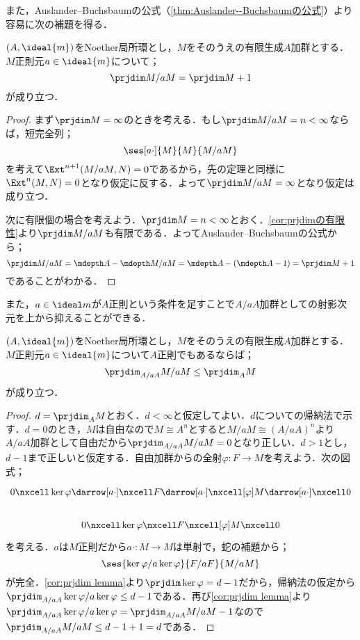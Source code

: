 また，Auslander--Buchsbaumの公式（\ref{thm:Auslander--Buchsbaumの公式}）より容易に次の補題を得る．

\begin{lem}\label{lem:prjdim M/aM}
	$(A,\ideal{m})$をNoether局所環とし，$M$をそのうえの有限生成$A$加群とする．$M$正則元$a\in\ideal{m}$について；
	\[\prjdim M/aM=\prjdim M+1\]
	が成り立つ．
\end{lem}

\begin{proof}
	まず$\prjdim M=\infty$のときを考える．もし$\prjdim M/aM=n<\infty$ならば，短完全列；
	\[\ses[a\cdot]{M}{M}{M/aM}\]
	を考えて$\Ext^{n+1}(M/aM,N)=0$であるから，先の定理と同様に$\Ext^n(M,N)=0$となり仮定に反する．よって$\prjdim M/aM=\infty$となり仮定は成り立つ．
	
	次に有限個の場合を考えよう．$\prjdim M=n<\infty$とおく．\ref{cor:prjdimの有限性}より$\prjdim M/aM$も有限である．よってAuslander--Buchsbaumの公式から；
	\[\prjdim M/aM=\mdepth A-\mdepth M/aM=\mdepth A-(\mdepth A-1)=\prjdim M+1\]
	であることがわかる．
\end{proof}

また，$a\in\ideal m$が$A$正則という条件を足すことで$A/aA$加群としての射影次元を上から抑えることができる．

\begin{lem}\label{lem:prjdim_A/aA M/aM}
	$(A,\ideal{m})$をNoether局所環とし，$M$をそのうえの有限生成$A$加群とする．$M$正則元$a\in\ideal{m}$について$A$正則でもあるならば；
	\[\prjdim_{A/aA} M/aM\leq \prjdim_A M\]
	が成り立つ．
\end{lem}

\begin{proof}
	$d=\prjdim_A M$とおく．$d<\infty$と仮定してよい．$d$についての帰納法で示す．$d=0$のとき，$M$は自由なので$M\cong A^n$とすると$M/aM\cong(A/aA)^n$より$A/aA$加群として自由だから$\prjdim_{A/aA}M/aM=0$となり正しい．$d>1$とし，$d-1$まで正しいと仮定する．自由加群からの全射$\varphi:F\to M$を考えよう．次の図式；
	\[\begin{tikzcd}
		0\nxcell\ker\varphi\darrow[a\cdot]\nxcell F\darrow[a\cdot]\nxcell[\varphi]M\darrow[a\cdot]\nxcell0\\
		0\nxcell \ker\varphi\nxcell F\nxcell[\varphi]M\nxcell0
	\end{tikzcd}\]
	を考える．$a$は$M$正則だから$a\cdot:M\to M$は単射で，蛇の補題から；
	\[\ses{\ker\varphi/a\ker\varphi}{F/aF}{M/aM}\]
	が完全．\ref{cor:prjdim lemma}より$\prjdim\ker\varphi=d-1$だから，帰納法の仮定から$\prjdim_{A/aA}\ker\varphi/a\ker\varphi\leq d-1$である．再び\ref{cor:prjdim lemma}より$\prjdim_{A/aA}\ker\varphi/a\ker\varphi=\prjdim_{A/aA}M/aM-1$なので$\prjdim_{A/aA}M/aM\leq d-1+1=d$である．
\end{proof}


